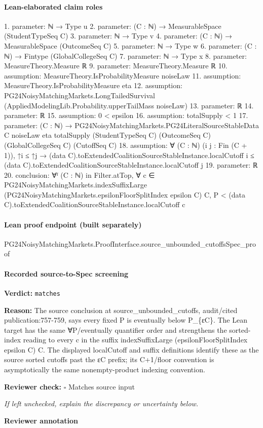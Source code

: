 \documentclass[10pt]{article}
\newcommand{\reviewerbox}{%
  \par\noindent\fbox{\parbox{0.96\linewidth}{\rule{0pt}{0.38in}}}\par
}
\newcommand{\reviewmatch}[1]{%
  \par\noindent\textbf{Reviewer check:} $\square$\; #1\par
  \noindent\emph{If left unchecked, explain the discrepancy or uncertainty below.}\par
}
\begin{document}
\paragraph{Lean-elaborated claim roles}\begin{ReviewVerbatim}
1. parameter: ℕ → Type u
2. parameter: (C : ℕ) → MeasurableSpace (StudentTypeSeq C)
3. parameter: ℕ → Type v
4. parameter: (C : ℕ) → MeasurableSpace (OutcomeSeq C)
5. parameter: ℕ → Type w
6. parameter: (C : ℕ) → Fintype (GlobalCollegeSeq C)
7. parameter: ℕ → Type x
8. parameter: MeasureTheory.Measure ℝ
9. parameter: MeasureTheory.Measure ℝ
10. assumption: MeasureTheory.IsProbabilityMeasure noiseLaw
11. assumption: MeasureTheory.IsProbabilityMeasure eta
12. assumption: PG24NoisyMatchingMarkets.LongTailedSurvival (AppliedModelingLib.Probability.upperTailMass noiseLaw)
13. parameter: ℝ
14. parameter: ℝ
15. assumption: 0 < epsilon
16. assumption: totalSupply < 1
17. parameter: (C : ℕ) →
  PG24NoisyMatchingMarkets.PG24LiteralSourceStableData C noiseLaw eta totalSupply (StudentTypeSeq C) (OutcomeSeq C)
    (GlobalCollegeSeq C) (CutoffSeq C)
18. assumption: ∀ (C : ℕ) (i j : Fin (C + 1)),
  ↑i ≤ ↑j →
    (data C).toExtendedCoalitionSourceStableInstance.localCutoff i ≤
      (data C).toExtendedCoalitionSourceStableInstance.localCutoff j
19. parameter: ℝ
20. conclusion: ∀ᶠ (C : ℕ) in Filter.atTop,
  ∀ c ∈ PG24NoisyMatchingMarkets.indexSuffixLarge (PG24NoisyMatchingMarkets.epsilonFloorSplitIndex epsilon C) C,
    P < (data C).toExtendedCoalitionSourceStableInstance.localCutoff c
\end{ReviewVerbatim}

\paragraph{Lean proof endpoint (built separately)}\begin{ReviewVerbatim}
PG24NoisyMatchingMarkets.ProofInterface.source_unbounded_cutoffsSpec_proof
\end{ReviewVerbatim}

\paragraph{Recorded source-to-Spec screening}
\textbf{Verdict:} \texttt{matches}
\\
{\raggedright
\textbf{Reason:} The source conclusion at source\_\allowbreak{}unbounded\_\allowbreak{}cutoffs, audit/\allowbreak{}cited publication:\allowbreak{}757-\allowbreak{}759, says every fixed P is eventually below P\_\allowbreak{}\{εC\}.\allowbreak{} The Lean target has the same ∀P/\allowbreak{}eventually quantifier order and strengthens the sorted-\allowbreak{}index reading to every c in the suffix indexSuffixLarge (epsilonFloorSplitIndex epsilon C) C.\allowbreak{} The displayed localCutoff and suffix definitions identify these as the source sorted cutoffs past the εC prefix;\allowbreak{} its C+1/\allowbreak{}floor convention is asymptotically the same nonempty-\allowbreak{}product indexing convention.\allowbreak{}
\par}
\reviewmatch{Matches source input}
\noindent\textbf{Reviewer annotation}\par
\reviewerbox
\clearpage
\hypertarget{source-claim-0a81e0b7c57cd17d}{}
\end{document}
